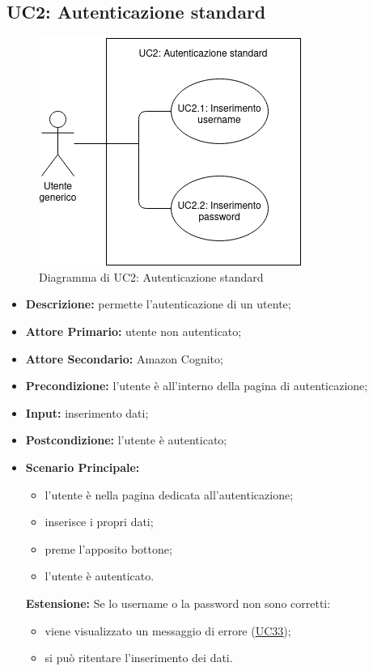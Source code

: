 \subsection{UC2: Autenticazione standard}
\begin{figure}[!ht]
    \caption{Diagramma di UC2: Autenticazione standard}
    \vspace{10px}
    \includegraphics[scale=0.5]{../../../Images/AnalisiRequisiti/UC02}
    \centering
\end{figure}
\label{sec:UC2}
\begin{itemize}
    \item \textbf{Descrizione:} permette l'autenticazione di un utente;
    \item \textbf{Attore Primario:} utente non autenticato;
    \item \textbf{Attore Secondario:} Amazon Cognito;
    \item \textbf{Precondizione:} l'utente è all'interno della pagina di autenticazione;
    \item \textbf{Input:} inserimento dati;
    \item \textbf{Postcondizione:} l'utente è autenticato;
    \item \textbf{Scenario Principale:}
          \begin{itemize}
              \item l'utente è nella pagina dedicata all'autenticazione;
              \item inserisce i propri dati;
              \item preme l'apposito bottone;
              \item l'utente è autenticato.
          \end{itemize}
          \textbf{Estensione:}
          Se lo username o la password non sono corretti:
          \begin{itemize}
              \item viene visualizzato un messaggio di errore (\hyperref[sec:UC33]{\underline{UC33}});
              \item si può ritentare l'inserimento dei dati.
          \end{itemize}
\end{itemize}

